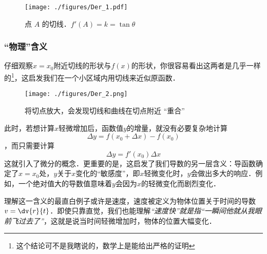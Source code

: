\begin{figure}[ht]
\centering
\texttt{[image: ./figures/Der\_1.pdf]}
\caption{点 $A$ 的切线．$f'(A)=k=\tan \theta$}
\end{figure}


\subsubsection{“物理”含义}
仔细观察$x=x_0$附近切线的形状与$f(x)$的形状，你很容易看出这两者是几乎一样的\footnote{这个结论可不是我瞎说的，数学上是能给出严格的证明}，这启发我们在一个小区域内用切线来近似原函数．

\begin{figure}[ht]
\centering
\texttt{[image: ./figures/Der\_2.png]}
\caption{将切点放大，会发现切线和曲线在切点附近 “重合”}
\end{figure}

此时，若想计算$x$轻微增加后，函数值$y$的增量，就没有必要复杂地计算
$$\Delta y = f(x_0+\Delta x) - f(x_0)$$
，而只需要计算
\begin{equation}
\Delta y = f'(x_0) \Delta x
\end{equation}
这就引入了微分的概念．更重要的是，这启发了我们导数的另一层含义：导函数确定了$x=x_0$处，$y$关于$x$变化的“敏感度”，即$x$轻微变化时，$y$会做出多大的响应．例如，一个绝对值大的导数值意味着$y$会因为$x$的轻微变化而剧烈变化．

理解这一含义的最直白例子或许是速度，速度被定义为物体位置关于时间的导数$v=\dv{r}{t}$．即使只靠直觉，我们也能理解\textsl{“速度快”就是指“一瞬间他就从我眼前飞过去了”}，这就是说当时间轻微增加时，物体的位置大幅变化．



